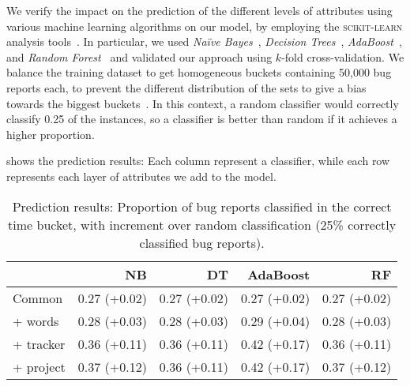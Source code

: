 We verify the impact on the prediction of the different levels of attributes using various machine learning algorithms on our model, by employing the \textsc{scikit-learn} analysis tools~\cite{Pedr2012}. In particular, we used \emph{Na\"ive Bayes}~\cite{mitc1997}, \emph{Decision Trees}~\cite{mitc1997}, \emph{AdaBoost}~\cite{bish2006}, and \emph{Random Forest}~\cite{brei01} and validated our approach using $k$-fold cross-validation. We balance the training dataset to get homogeneous buckets containing 50,000 bug reports each, to prevent the different distribution of the sets to give a bias towards the biggest buckets~\cite{bati2004}. In this context, a random classifier would correctly classify 0.25 of the instances, so a classifier is better than random if it achieves a higher proportion. 

 shows the prediction results: Each column represent a classifier, while each row represents each layer of attributes we add to the model. 

\begin{table}[ht]
\centering
\caption{Prediction results: Proportion of bug reports classified in the correct time bucket, with increment over  random classification (25\% correctly classified bug reports).}
\begin{tabular}{l|r|r|r|r}
 & \textbf{NB} & \textbf{DT} & \textbf{AdaBoost} & \textbf{RF} \\
 \hline 
Common & 0.27 (+0.02) & 0.27 (+0.02) & 0.27 (+0.02) & 0.27 (+0.02) \\
+ words & 0.28 (+0.03) & 0.28 (+0.03) & 0.29 (+0.04) & 0.28 (+0.03) \\
+ tracker & 0.36 (+0.11) & 0.36 (+0.11) & 0.42 (+0.17) & 0.36 (+0.11) \\
+ project & 0.37 (+0.12) & 0.36 (+0.11) & 0.42 (+0.17) & 0.37 (+0.12) \\
\hline
\end{tabular}
\label{tab:ml-results}
\end{table}

